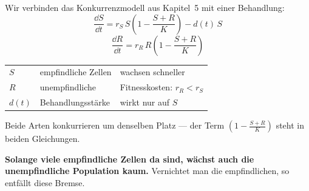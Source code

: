 \begin{merksatz}
Wir verbinden das Konkurrenzmodell aus Kapitel~5 mit einer Behandlung:
\[ \frac{\dd S}{\dd t} = r_S\,S\left(1-\frac{S+R}{K}\right) - d(t)\,S \]
\[ \frac{\dd R}{\dd t} = r_R\,R\left(1-\frac{S+R}{K}\right) \]

\begin{center}
{\small
\renewcommand{\arraystretch}{1.48}
\begin{tabular}{@{}P{1.6cm}P{3.0cm}P{3.4cm}@{}}
\toprule
$S$ & empfindliche Zellen & wachsen schneller\\
$R$ & unempfindliche & \textcolor{akzent}{Fitnesskosten: $r_R < r_S$}\\
$d(t)$ & Behandlungsstärke & wirkt nur auf $S$\\
\bottomrule
\end{tabular}}
\end{center}

Beide Arten konkurrieren um denselben Platz --- der Term $(1-\frac{S+R}{K})$ steht in beiden Gleichungen.

\begin{center}
\begin{minipage}{0.9\textwidth}
\textbf{Solange viele empfindliche Zellen da sind, wächst auch die unempfindliche Population kaum.} Vernichtet man die empfindlichen, so entfällt diese Bremse.
\end{minipage}
\end{center}
\end{merksatz}


